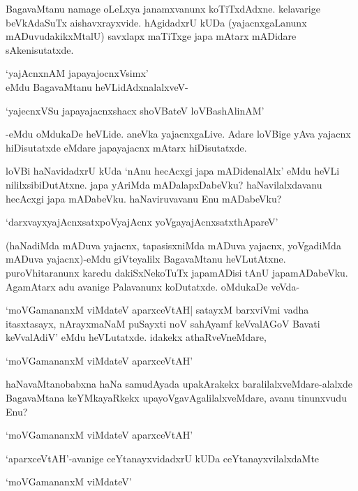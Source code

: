 BagavaMtanu namage oLeLxya janamxvanunx koTiTxdAdxne. kelavarige beVkAdaSuTx aishavxrayxvide. hAgidadxrU kUDa (yajacnxgaLanunx mADuvudakikxMtalU) savxlapx maTiTxge japa mAtarx mADidare sAkenisutatxde.

\begin{shloka}
`yajAcnxnAM japayajocnxV\s simx'\\
eMdu BagavaMtanu heVLidAdxnalalxveV-
\end{shloka}

\begin{shloka}
`yajecnxVSu japayajacnxshacx shoVBateV loVBashAlinAM'
\end{shloka}

-eMdu oMdukaDe heVLide. aneVka yajacnxgaLive. Adare loVBige yAva yajacnx hiDisutatxde eMdare japayajacnx mAtarx hiDisutatxde.

loVBi haNavidadxrU kUda `nAnu hecAcxgi japa mADidenalAlx' eMdu heVLi nililxsibiDutAtxne. japa yAriMda mADalapxDabeVku? haNavilalxdavanu hecAcxgi japa mADabeVku. haNaviruvavanu Enu mADabeVku?

\begin{shloka}
`darxvayxyajAcnxsatxpoVyajAcnx yoVgayajAcnxsatxthApareV'
\end{shloka}

(haNadiMda mADuva yajacnx, tapasisxniMda mADuva yajacnx, yoVgadiMda mADuva yajacnx)-eMdu giVteyalilx BagavaMtanu heVLutAtxne. puroVhitaranunx karedu dakiSxNekoTuTx japamADisi tAnU japamADabeVku. AgamAtarx adu avanige Palavanunx koDutatxde. oMdukaDe veVda-

`moVGamananxM viMdateV aparxceVtAH| satayxM barxviVmi vadha itasxtasayx, nArayxmaNaM puSayxti noV sahAyamf keVvalAGoV Bavati keVvalAdiV' eMdu heVLutatxde. idakekx athaRveVneMdare,

\begin{shloka}
`moVGamananxM viMdateV aparxceVtAH'
\end{shloka}

haNavaMtanobabxna haNa samudAyada upakArakekx baralilalxveMdare-alalxde BagavaMtana keYMkayaRkekx upayoVgavAgalilalxveMdare, avanu tinunxvudu Enu?

\begin{shloka}
`moVGamananxM viMdateV aparxceVtAH'
\end{shloka}

`aparxceVtAH'-avanige ceYtanayxvidadxrU kUDa ceYtanayxvilalxdaMte 

\begin{shloka}
`moVGamananxM viMdateV'
\end{shloka}


